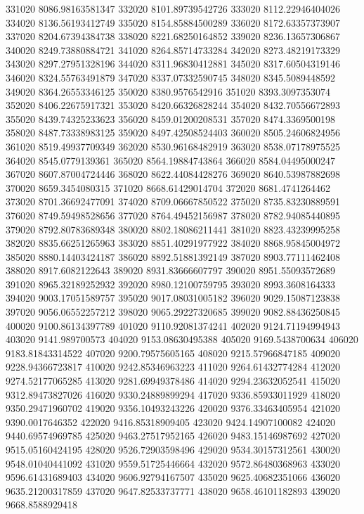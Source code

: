 {331020 8086.98163581347
332020 8101.89739542726
333020 8112.22946404026
334020 8136.56193412749
335020 8154.85884500289
336020 8172.63357373907
337020 8204.67394384738
338020 8221.68250164852
339020 8236.13657306867
340020 8249.73880884721
341020 8264.85714733284
342020 8273.48219173329
343020 8297.27951328196
344020 8311.96830412881
345020 8317.60504319146
346020 8324.55763491879
347020 8337.07332590745
348020 8345.5089448592
349020 8364.26553346125
350020 8380.9576542916
351020 8393.3097353074
352020 8406.22675917321
353020 8420.66326828244
354020 8432.70556672893
355020 8439.74325233623
356020 8459.01200208531
357020 8474.3369500198
358020 8487.73338983125
359020 8497.42508524403
360020 8505.24606824956
361020 8519.49937709349
362020 8530.96168482919
363020 8538.07178975525
364020 8545.0779139361
365020 8564.19884743864
366020 8584.04495000247
367020 8607.87004724446
368020 8622.44084428276
369020 8640.53987882698
370020 8659.3454080315
371020 8668.61429014704
372020 8681.4741264462
373020 8701.36692477091
374020 8709.06667850522
375020 8735.83230889591
376020 8749.59498528656
377020 8764.49452156987
378020 8782.94085440895
379020 8792.80783689348
380020 8802.18086211441
381020 8823.43239995258
382020 8835.66251265963
383020 8851.40291977922
384020 8868.95845004972
385020 8880.14403424187
386020 8892.51881392149
387020 8903.77111462408
388020 8917.6082122643
389020 8931.83666607797
390020 8951.55093572689
391020 8965.32189252932
392020 8980.12100759795
393020 8993.3608164333
394020 9003.17051589757
395020 9017.08031005182
396020 9029.15087123838
397020 9056.06552257212
398020 9065.29227320685
399020 9082.88436250845
400020 9100.86134397789
401020 9110.92081374241
402020 9124.71194994943
403020 9141.989700573
404020 9153.08630495388
405020 9169.5438700634
406020 9183.81843314522
407020 9200.79575605165
408020 9215.57966847185
409020 9228.94366723817
410020 9242.85346963223
411020 9264.61432774284
412020 9274.52177065285
413020 9281.69949378486
414020 9294.23632052541
415020 9312.89473827026
416020 9330.24889899294
417020 9336.85933011929
418020 9350.29471960702
419020 9356.10493243226
420020 9376.33463405954
421020 9390.0017646352
422020 9416.85318909405
423020 9424.14907100082
424020 9440.69574969785
425020 9463.27517952165
426020 9483.15146987692
427020 9515.05160424195
428020 9526.72903598496
429020 9534.30157312561
430020 9548.01040441092
431020 9559.51725446664
432020 9572.86480368963
433020 9596.61431689403
434020 9606.92794167507
435020 9625.40682351066
436020 9635.21200317859
437020 9647.82533737771
438020 9658.46101182893
439020 9668.8588929418
}
